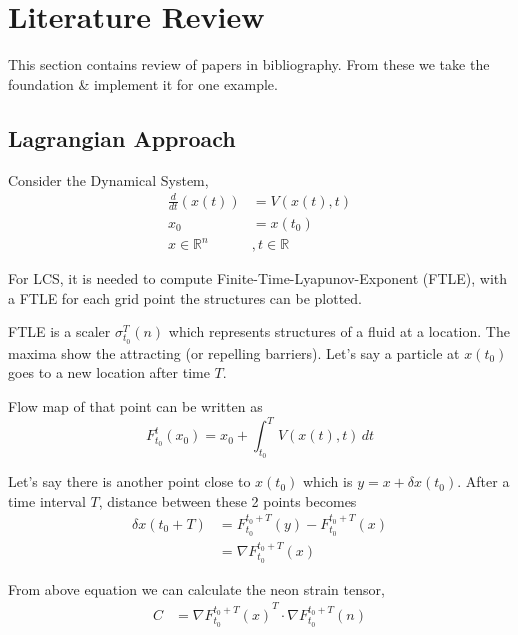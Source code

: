 \documentclass[../report.tex]{subfiles}
\begin{document}
\chapter{Literature Review}

This section contains review of papers in bibliography. From these we take the foundation \& implement it for one example.

\section{Lagrangian Approach}
Consider the Dynamical System,
\begin{equation}
  \begin{aligned}
    \frac{d}{dt}(x(t)) &= V(x(t), t) \\
    x_0 &= x(t_0) \\
    x \in \mathbb{R}^n &, t \in \mathbb{R}
  \end{aligned}
\end{equation}

For LCS, it is needed to compute Finite-Time-Lyapunov-Exponent (FTLE), with a FTLE for each grid point the structures can be plotted. \par

FTLE is a scaler \(\sigma_{t_0}^T(n)\) which represents structures of a fluid at a location. The maxima show the attracting (or repelling barriers). Let's say a particle at \(x(t_0)\) goes to a new location after time \(T\). \par

Flow map of that point can be written as
\begin{equation}
  F_{t_0}^t(x_0) = x_0 + \int_{t_0}^{T} V(x(t), t)\,dt
\end{equation}

Let's say there is another point close to \(x(t_0)\) which is \(y = x + \delta x(t_0)\). After a time interval \(T\), distance between these 2 points becomes
\begin{equation}
  \begin{aligned}
    \delta x(t_0 + T) &= F_{t_0}^{t_0 + T} (y) - F_{t_0}^{t_0 + T} (x) \\
    &= \nabla F_{t_0}^{t_0 + T}(x)
  \end{aligned}
\end{equation}

From above equation we can calculate the neon strain tensor,
\begin{equation}
  \begin{aligned}
    C &= \nabla {F_{t_0}^{t_0 + T}(x)}^T \cdot \nabla F_{t_0}^{t_0 + T}(n)
  \end{aligned}
\end{equation}
\end{document}
